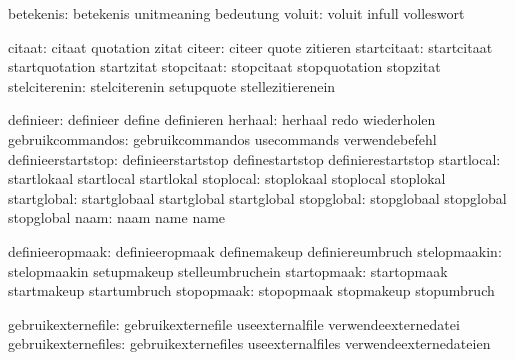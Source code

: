                     betekenis:  betekenis                    unitmeaning
                                bedeutung
                       voluit:  voluit                       infull
                                volleswort

                       citaat:  citaat                       quotation
                                zitat
                       citeer:  citeer                       quote
                                zitieren
                  startcitaat:  startcitaat                  startquotation
                                startzitat
                   stopcitaat:  stopcitaat                   stopquotation
                                stopzitat
                stelciterenin:  stelciterenin                setupquote
                                stellezitierenein

                    definieer:  definieer                    define
                                definieren
                      herhaal:  herhaal                      redo
                                wiederholen
             gebruikcommandos:  gebruikcommandos             usecommands
                                verwendebefehl
           definieerstartstop:  definieerstartstop           definestartstop
                                definierestartstop
                   startlocal:  startlokaal                  startlocal
                                startlokal
                    stoplocal:  stoplokaal                   stoplocal
                                stoplokal
                  startglobal:  startglobaal                 startglobal
                                startglobal
                   stopglobal:  stopglobaal                  stopglobal
                                stopglobal
                         naam:  naam                         name
                                name

              definieeropmaak:  definieeropmaak              definemakeup
                                definiereumbruch
                 stelopmaakin:  stelopmaakin                 setupmakeup
                                stelleumbruchein
                  startopmaak:  startopmaak                  startmakeup
                                startumbruch
                   stopopmaak:  stopopmaak                   stopmakeup
                                stopumbruch

           gebruikexternefile:  gebruikexternefile           useexternalfile
                                verwendeexternedatei
          gebruikexternefiles:  gebruikexternefiles          useexternalfiles
                                verwendeexternedateien

